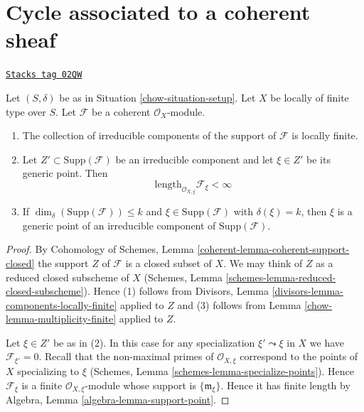 \section{Cycle associated to a coherent sheaf}
\label{chow-section-cycle-of-coherent-sheaf}
\begin{lemma}
\label{chow-lemma-length-finite}
\href{https://stacks.math.columbia.edu/tag/02QW}{\texttt{Stacks tag 02QW}}

Let $(S, \delta)$ be as in Situation \ref{chow-situation-setup}.
Let $X$ be locally of finite type over $S$.
Let $\mathcal{F}$ be a coherent $\mathcal{O}_X$-module.
\begin{enumerate}
\item The collection of irreducible components of the support of
$\mathcal{F}$ is locally finite.
\item Let $Z' \subset \text{Supp}(\mathcal{F})$
be an irreducible component and
let $\xi \in Z'$ be its generic point.
Then
$$
\text{length}_{\mathcal{O}_{X, \xi}} \mathcal{F}_\xi < \infty
$$
\item If $\dim_\delta(\text{Supp}(\mathcal{F})) \leq k$
and $\xi \in \text{Supp}(\mathcal{F})$ with $\delta(\xi) = k$, then $\xi$ is a
generic point of an irreducible component of $\text{Supp}(\mathcal{F})$.
\end{enumerate}
\end{lemma}

\begin{proof}

By Cohomology of Schemes, Lemma \ref{coherent-lemma-coherent-support-closed}
the support $Z$ of $\mathcal{F}$ is a closed subset of $X$.
We may think of $Z$ as a reduced closed subscheme of $X$
(Schemes, Lemma \ref{schemes-lemma-reduced-closed-subscheme}).
Hence (1) follows from
Divisors, Lemma \ref{divisors-lemma-components-locally-finite} applied to $Z$
and (3) follows from
Lemma \ref{chow-lemma-multiplicity-finite} applied to $Z$.

\medskip\noindent
Let $\xi \in Z'$ be as in (2). In this case for any specialization
$\xi' \leadsto \xi$ in $X$ we have $\mathcal{F}_{\xi'} = 0$.
Recall that the non-maximal primes of $\mathcal{O}_{X, \xi}$ correspond
to the points of $X$ specializing to $\xi$
(Schemes, Lemma \ref{schemes-lemma-specialize-points}).
Hence $\mathcal{F}_\xi$ is a finite $\mathcal{O}_{X, \xi}$-module
whose support is $\{\mathfrak m_\xi\}$. Hence it has finite length
by Algebra, Lemma \ref{algebra-lemma-support-point}.
\end{proof}

